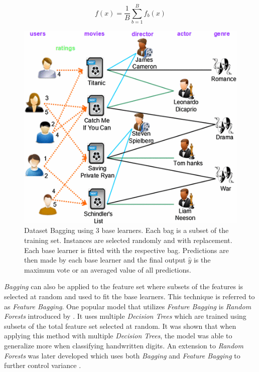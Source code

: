 \begin{equation}\label{eq:baggingmean}
    f(x) = \frac{1}{B} \sum_{b=1}^{B} f_b(x)
\end{equation}

\begin{figure}
  \includegraphics{graphics/user_matrix/usermatrix.JPG}
  \caption{
    Dataset Bagging using 3 base learners. Each bag is a subset of the training set. Instances are selected randomly and with replacement. Each base learner is fitted with the respective bag. Predictions are then made by each base learner and the final output $\hat{y}$ is the maximum vote or an averaged value of all predictions. 
  }
  \label{fig:baggingexample}
\end{figure}

\textit{Bagging} can also be applied to the feature set where subsets of the features is selected at random and used to fit the base learners. This technique is referred to as \textit{Feature Bagging}. One popular model that utilizes \textit{Feature Bagging} is \textit{Random Forests} introduced by \citet{ho1995random}. It uses multiple \textit{Decision Trees} which are trained using subsets of the total feature set selected at random. It was shown that when applying this method with multiple \textit{Decision Trees}, the model was able to generalize more when classifying handwritten digits. An extension to \textit{Random Forests} was later developed which uses both \textit{Bagging} and \textit{Feature Bagging} to further control variance \citep{breiman2001random}.

